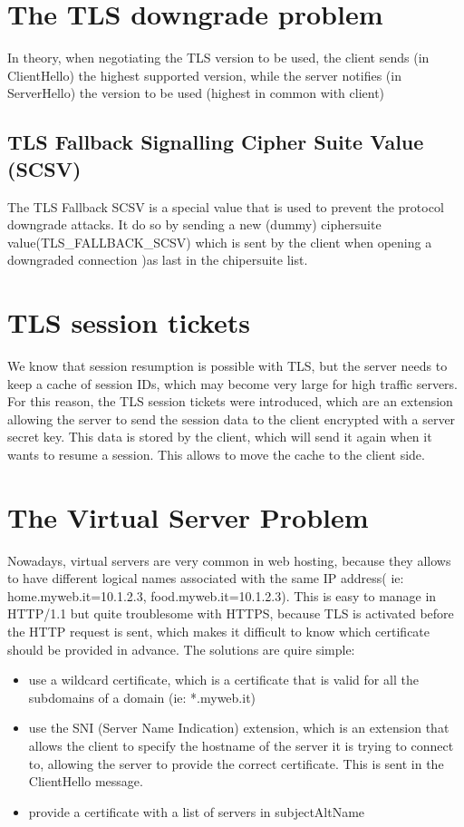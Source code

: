 \documentclass{report}
\begin{document}
\section{The TLS downgrade problem}
In theory, when negotiating the TLS version to be used, the client
sends (in ClientHello) the highest supported version, while the server
notifies (in ServerHello) the version to be used (highest in common
with client)

\subsection{TLS Fallback Signalling Cipher Suite Value (SCSV)}
The TLS Fallback SCSV is a special value that is used to prevent 
the protocol downgrade attacks. It do so by sending a new (dummy)
ciphersuite value(TLS\_FALLBACK\_SCSV) which is sent by the client when
opening a downgraded connection )as last in the chipersuite list.

\section{TLS session tickets}
We know that session resumption is possible with TLS, but the server
needs to keep a cache of session IDs, which may become very large for
high traffic servers. For this reason, the TLS session tickets were
introduced, which are an extension allowing the server to send the
session data to the client encrypted with a server secret key. This
data is stored by the client, which will send it again when it wants
to resume a session. This allows to move the cache to the client side.

\section{The Virtual Server Problem}
Nowadays, virtual servers are very common in web hosting, because they
allows to have different logical names associated with the same IP
address( ie: home.myweb.it=10.1.2.3, food.myweb.it=10.1.2.3).
This is easy to manage in HTTP/1.1 but quite troublesome with HTTPS,
because TLS is activated before the HTTP request is sent, which makes
it difficult to know which certificate should be provided in advance.
The solutions are quire simple:
\begin{itemize}
  \item use a wildcard certificate, which is a certificate that is
    valid for all the subdomains of a domain (ie: *.myweb.it)
  \item use the SNI (Server Name Indication) extension, which is an
    extension that allows the client to specify the hostname of the
    server it is trying to connect to, allowing the server to provide
    the correct certificate. This is sent in the ClientHello message.
  \item provide a certificate with a list of servers in subjectAltName
\end{itemize}
\end{document}
